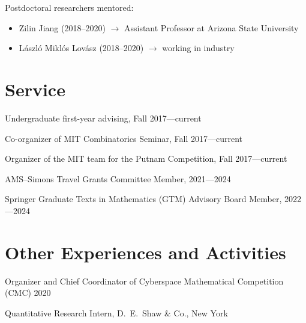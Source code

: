 \documentclass[11pt]{amsart}
\begin{document}
Postdoctoral researchers mentored:
\begin{itemize}[topsep=-.5ex,label={},leftmargin=.2in]
\item Zilin Jiang (2018--2020) $\to$ Assistant Professor at Arizona State University
\item L\'aszl\'o Mikl\'os Lov\'asz (2018--2020) $\to$ working in industry
\end{itemize}

\section*{Service}

Undergraduate first-year advising, Fall 2017---current

Co-organizer of MIT Combinatorics Seminar, Fall 2017---current

Organizer of the MIT team for the Putnam Competition, Fall 2017---current

AMS--Simons Travel Grants Committee Member, 2021---2024

Springer Graduate Texts in Mathematics (GTM) Advisory Board Member, 2022---2024




\section*{Other Experiences and Activities}

Organizer and Chief Coordinator of Cyberspace Mathematical Competition (CMC) 2020

Quantitative Research Intern, D.\ E.\ Shaw \& Co., New York
\end{document}
